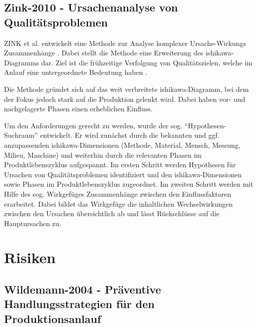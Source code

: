\subsection*{Zink-2010 - Ursachenanalyse von Qualitätsproblemen}

ZINK et al. entwickelt eine Methode zur Analyse komplexer Ursache-Wirkungs Zusammenhänge \autocite{Zink2010}. Dabei stellt die Methode eine Erweiterung des \gls{ishikawa}-Diagramms dar. Ziel ist die frühzeitige Verfolgung von Qualitätszielen, welche im Anlauf eine untergeordnete Bedeutung haben \autocite{Fleischer2003, Terwiesch2001a}. 

Die Methode gründet sich auf das weit verbreitete \gls{ishikawa}-Diagramm, bei dem der Fokus jedoch stark auf die Produktion gelenkt wird. Dabei haben vor- und nachgelagerte Phasen einen erheblichen Einfluss. 

Um den Anforderungen gerecht zu werden, wurde der sog. ``Hypothesen-Suchraum'' entwickelt. Er wird zunächst durch die bekannten und ggf. anzupassenden \gls{ishikawa}-Dimensionen (Methode, Material, Mensch, Messung, Milieu, Maschine) und weiterhin durch die relevanten Phasen im Produktlebenszyklus aufgespannt. 
Im ersten Schritt werden Hypothesen für Ursachen von Qualitätsproblemen identifiziert und den \gls{ishikawa}-Dimensionen sowie Phasen im Produktlebenszyklus zugeordnet. 
Im zweiten Schritt werden mit Hilfe des sog. Wirkgefüges Zusammenhänge zwischen den Einflussfaktoren erarbeitet. Dabei bildet das Wirkgefüge die inhaltlichen Wechselwirkungen zwischen den Ursachen übersichtlich ab und lässt Rückschlüsse auf die Hauptursachen zu. 

\section{Risiken}

\subsection*{Wildemann-2004 - Präventive Handlungsstrategien für den Produktionsanlauf}

